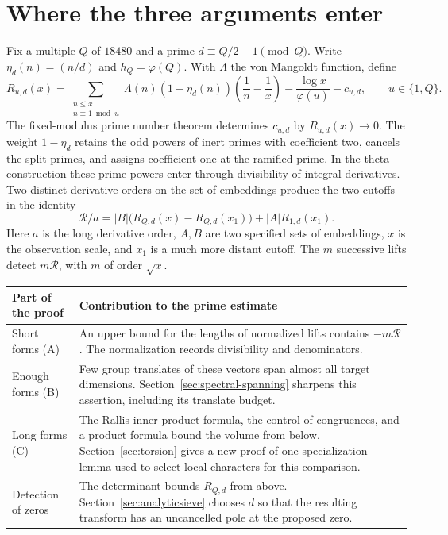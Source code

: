 \documentclass[11pt]{article}
\begin{document}
\section{Where the three arguments enter}
Fix a multiple $Q$ of $18480$ and a prime $d\equiv Q/2-1\pmod Q$. Write $\eta_d(n)=(n/d)$ and $h_Q=\varphi(Q)$. With $\Lambda$ the von Mangoldt function, define
\begin{equation}
 R_{u,d}(x)=\sum_{\substack{n\le x\\n\equiv1\bmod u}}
 \Lambda(n)(1-\eta_d(n))\left(\frac1n-\frac1x\right)
      -\frac{\log x}{\varphi(u)}-c_{u,d},\qquad u\in\{1,Q\}.
 \label{eq:remainder}
\end{equation}
The fixed-modulus prime number theorem determines $c_{u,d}$ by $R_{u,d}(x)\to0$. The weight $1-\eta_d$ retains the odd powers of inert primes with coefficient two, cancels the split primes, and assigns coefficient one at the ramified prime. In the theta construction these prime powers enter through divisibility of integral derivatives. Two distinct derivative orders on the set of embeddings produce the two cutoffs in the identity
\[
  \mathcal R/a=|B|\bigl(R_{Q,d}(x)-R_{Q,d}(x_1)\bigr)+|A|R_{1,d}(x_1).
\]
Here $a$ is the long derivative order, $A,B$ are two specified sets of embeddings, $x$ is the observation scale, and $x_1$ is a much more distant cutoff. The $m$ successive lifts detect $m\mathcal R$, with $m$ of order $\sqrt{x}$.
\par\noindent
\begin{tabularx}{\linewidth}{@{}p{.20\linewidth}X@{}}
\toprule
\textbf{Part of the proof}&\textbf{Contribution to the prime estimate}\\\midrule
Short forms (A)&An upper bound for the lengths of normalized lifts contains $-m\mathcal R$. The normalization records divisibility and denominators.\\
Enough forms (B)&Few group translates of these vectors span almost all target dimensions. Section~\ref{sec:spectral-spanning} sharpens this assertion, including its translate budget.\\
Long forms (C)&The Rallis inner-product formula, the control of congruences, and a product formula bound the volume from below. Section~\ref{sec:torsion} gives a new proof of one specialization lemma used to select local characters for this comparison.\\
Detection of zeros&The determinant bounds $R_{Q,d}$ from above. Section~\ref{sec:analyticsieve} chooses $d$ so that the resulting transform has an uncancelled pole at the proposed zero.\\\bottomrule
\end{tabularx}
\end{document}
